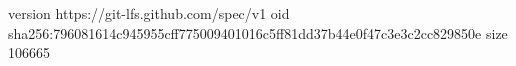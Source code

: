 version https://git-lfs.github.com/spec/v1
oid sha256:796081614c945955cff775009401016c5ff81dd37b44e0f47c3e3c2cc829850e
size 106665
